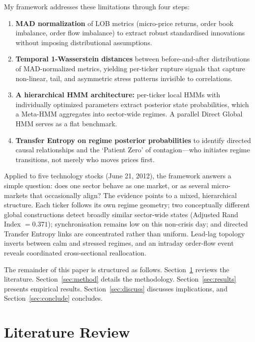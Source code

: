 \documentclass{article}
\begin{document}
My framework addresses these limitations through four steps:
\begin{enumerate}
    \item \textbf{MAD normalization} of LOB metrics (micro-price returns, order
    book imbalance, order flow imbalance) to extract robust standardised
    innovations without imposing distributional assumptions.
    \item \textbf{Temporal 1-Wasserstein distances} between before-and-after
    distributions of MAD-normalized metrics, yielding per-ticker rupture signals
    that capture non-linear, tail, and asymmetric stress patterns invisible to
    correlations.
    \item \textbf{A hierarchical HMM architecture:} per-ticker local HMMs with
    individually optimized parameters extract posterior state probabilities,
    which a Meta-HMM aggregates into sector-wide regimes. A parallel Direct
    Global HMM serves as a flat benchmark.
    \item \textbf{Transfer Entropy on regime posterior probabilities} to identify
    directed causal relationships and the `Patient Zero' of contagion---who
    initiates regime transitions, not merely who moves prices first.
\end{enumerate}

Applied to five technology stocks (June 21, 2012), the framework answers a
simple question: does one sector behave as one market, or as several
micro-markets that occasionally align? The evidence points to a mixed,
hierarchical structure. Each ticker follows its own regime geometry; two
conceptually different global constructions detect broadly similar sector-wide
states (Adjusted Rand Index $= 0.371$); synchronisation remains low on this
non-crisis day; and directed Transfer Entropy links are concentrated rather than
uniform. Lead-lag topology inverts between calm and stressed regimes, and an
intraday order-flow event reveals coordinated cross-sectional reallocation.

The remainder of this paper is structured as follows.
Section~\ref{sec:lit} reviews the literature.
Section~\ref{sec:method} details the methodology.
Section~\ref{sec:results} presents empirical results.
Section~\ref{sec:discuss} discusses implications, and
Section~\ref{sec:conclude} concludes.

\section{Literature Review}
\label{sec:lit}
\end{document}
